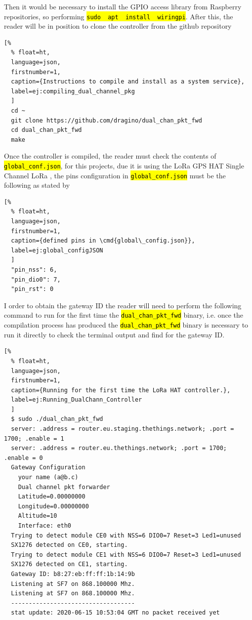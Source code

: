 \documentclass[11pt,a4paper,dvipsnames,twoside]{article}
\newcommand{\cmd}[1] {\hl{\texttt{#1}}}
\begin{document}
Then it would be necessary to install the GPIO access library from Raspberry repositories, so performing \cmd{sudo\, apt\, install\, wiringpi}. After this, the reader will be in position to clone the controller from the github repository \cite{Dragino_DualChannelController_Rpi}

\begin{lstlisting}[%
  % float=ht,
  language=json,
  firstnumber=1,
  caption={Instructions to compile and install as a system service},
  label=ej:compiling_dual_channel_pkg
  ]
  cd ~
  git clone https://github.com/dragino/dual_chan_pkt_fwd
  cd dual_chan_pkt_fwd
  make
\end{lstlisting}

Once the controller is compiled, the reader must check the contents of \cmd{global\_conf.json}, for this projects, due it is using the LoRa GPS HAT Single Channel LoRa \cite{DraginoRpiHat}, the pins configuration in \cmd{global\_conf.json} must be the following as stated by \cite{Dragino_DualChannelController_Rpi}

\begin{lstlisting}[%
  % float=ht,
  language=json,
  firstnumber=1,
  caption={defined pins in \cmd{global\_config.json}},
  label=ej:global_configJSON
  ]
  "pin_nss": 6,
  "pin_dio0": 7,
  "pin_rst": 0
\end{lstlisting}

I order to obtain the gateway ID the reader will need to perform the following command to run for the first time the \cmd{dual\_chan\_pkt\_fwd} binary, i.e. once the compilation process has produced the \cmd{dual\_chan\_pkt\_fwd} binary is necessary to run it directly to check the terminal output and find for the gateway ID.

\begin{lstlisting}[%
  % float=ht,
  language=json,
  firstnumber=1,
  caption={Running for the first time the LoRa HAT controller.},
  label=ej:Running_DualChann_Controller
  ]
  $ sudo ./dual_chan_pkt_fwd
  server: .address = router.eu.staging.thethings.network; .port = 1700; .enable = 1
  server: .address = router.eu.thethings.network; .port = 1700; .enable = 0
  Gateway Configuration
    your name (a@b.c)
    Dual channel pkt forwarder
    Latitude=0.00000000
    Longitude=0.00000000
    Altitude=10
    Interface: eth0
  Trying to detect module CE0 with NSS=6 DIO0=7 Reset=3 Led1=unused
  SX1276 detected on CE0, starting.
  Trying to detect module CE1 with NSS=6 DIO0=7 Reset=3 Led1=unused
  SX1276 detected on CE1, starting.
  Gateway ID: b8:27:eb:ff:ff:1b:14:9b
  Listening at SF7 on 868.100000 Mhz.
  Listening at SF7 on 868.100000 Mhz.
  -----------------------------------
  stat update: 2020-06-15 10:53:04 GMT no packet received yet 
\end{lstlisting}
\end{document}
